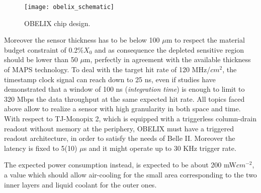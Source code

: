 \begin{figure}[h!]
\centering
\texttt{[image: obelix\_schematic]}
\caption{OBELIX chip design.}
\label{fig:obelix_scheme}
\end{figure}

Moreover the sensor thickness has to be below 100 $\mu$m to respect the material budget constraint of 0.2\%$X_{0}$ and as consequence the depleted sensitive region should be lower than 50 $\mu$m, perfectly in agreement with the available thickness of MAPS  technology. 
To deal with the target hit rate of 120 MHz/$cm^{2}$, the timestamp clock signal can reach down to 25 ns, even if studies have demonstrated that a window of 100 ns (\textit{integration time}) is enough to limit to 320 Mbps the data throughput at the same expected hit rate. 
All topics faced above allow to realize a sensor with high granularity in both space and time.\\

With respect to TJ-Monopix 2, which is equipped with a triggerless column-drain readout without memory at the periphery, OBELIX must have a triggered readout architecture, in order to satisfy the needs of Belle II. Moreover the latency is fixed to 5(10) $\mu$s and it might operate up to 30 KHz trigger rate.

The expected power consumption instead, is expected to be about 200 mW$cm^{-2}$, a value which should allow air-cooling for the small area corresponding to the two inner layers and liquid coolant for the outer ones. 


\begin{comment}
Tolerance to Total Ionizing Dose (TID) and Non Ionizing Energy Loss (NIEL)
fluence have been discussed already. But Single Event Effects (SEE) generated
by radiation might affect the sensor. Since no latchup (SEL) were observed in the
past operation years of Belle II, no specification is given. However Single Event
Upset (SEU) were observed and will be a concern to some extent, but are not yet
35 quantified. Consequently, the first specification is to ensure that the control system
allows resetting the sensor registers to the operational values at least every
few minutes. The actual frequency will be chosen after the measurement of the
SEU cross section with the OBELIX sensor and the comparison to the occurrence
distribution of large energy loss in the experiment.
\end{comment}

